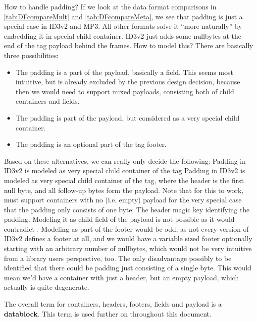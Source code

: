 How to handle padding? If we look at the data format comparisons in \ref{tab:DFcompareMult} and \ref{tab:DFcompareMeta}, we see that padding is just a special case in ID3v2 and MP3. All other formats solve it ``more naturally'' by embedding it in special child container. ID3v2 just adds some nullbytes at the end of the tag payload behind the frames. How to model this? There are basically three possibilities:
\begin{itemize}
\item The padding is a part of the payload, basically a field. This seems most intuitive, but is already excluded by the previous design decision, because then we would need to support mixed payloads, consisting both of child containers and fields.
\item The padding is part of the payload, but considered as a very special child container.
\item The padding is an optional part of the tag footer.
\end{itemize}

Based on these alternatives, we can really only decide the following:
{%
Padding in ID3v2 is modeled as very special child container of the tag
}
{%
Padding in ID3v2 is modeled as very special child container of the tag, where the header is the first null byte, and all follow-up bytes form the payload. Note that for this to work, \LibName{} must support containers with no (i.e. empty) payload for the very special case that the padding only consists of one byte: The header magic key identifying the padding. 
}
{%
Modeling it as child field of the payload is not possible as it would contradict . Modeling as part of the footer would be odd, as not every version of ID3v2 defines a footer at all, and we would have a variable sized footer optionally starting with an arbitrary number of nullbytes, which would not be very intuitive from a library users perspective, too.
}
{%
The only disadvantage possibly to be identified that there could be padding just consisting of a single byte. This would mean we'd have a container with just a header, but an empty payload, which actually is quite degenerate.
}

The overall term for containers, headers, footers, fields and payload is a \textbf{datablock}. This term is used further on throughout this document.


